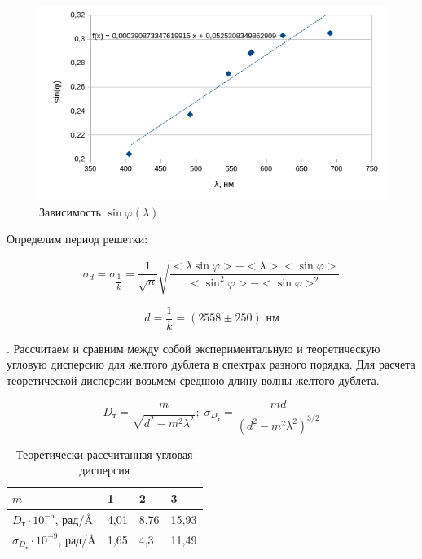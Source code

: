 \documentclass[a4paper, 12pt]{article}
\begin{document}
\begin{figure}[h!]
\begin{center}
\includegraphics[width=1\textwidth]{graph1.png}
\end{center}
\caption{Зависимость $\sin \varphi (\lambda)$} \label{Лямбда от фи}
\end{figure}

Определим период решетки:

\[\sigma_d = \sigma_{\dfrac{1}{k}} =\dfrac{1}{\sqrt{n}}\sqrt{\dfrac{<\lambda \sin \varphi> - <\lambda> <\sin \varphi>}{<\sin^2 \varphi> - <\sin \varphi>^2}}\]

\[d = \dfrac{1}{k} = (2558 \pm 250) \text{ нм}\]

. Рассчитаем и сравним между собой экспериментальную и теоретическую угловую дисперсию для желтого дублета в спектрах разного порядка. Для расчета теоретической дисперсии возьмем среднюю длину волны желтого дублета.

\[D_\text{т} = \dfrac{m}{\sqrt{d^2-m^2 \lambda^2}} \text{;}~~ \sigma_{D_\text{т}} = \dfrac{md}{(d^2-m^2 \lambda^2)^{3/2}}\]

\begin{table}[h!]
\centering
\label{Теор дисперсия}
\begin{tabular}{|l|l|l|l|}
\hline
$m$     & 1                           & 2             & 3\\ \hline
$D_\text{т} \cdot 10^{-5}$, рад/$\text{\AA}$   & 4,01 & 8,76  & 15,93   \\ \hline
$\sigma_{D_\text{т}} \cdot 10^{-9}$, рад/$\text{\AA}$ & 1,65 & 4,3 & 11,49\\ \hline
\end{tabular}
\caption{Теоретически рассчитанная угловая дисперсия}
\end{table}
 
\end{document}
